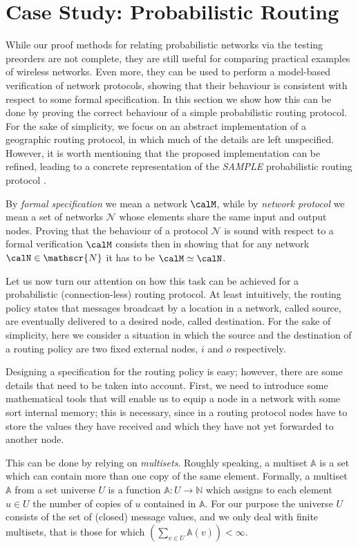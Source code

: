 \documentclass{LMCS}
\begin{document}
\section{Case Study: Probabilistic Routing}
\label{sec:prob.routing}
While our proof methods for relating probabilistic networks 
via the testing preorders are not complete, they are still 
useful for comparing practical examples of wireless networks. 
Even more, they can be used to perform a model-based verification
of network protocols, showing that their behaviour 
is consistent with respect to some formal specification. 
In this section we show how this can be done by proving the 
correct behaviour of a simple probabilistic routing protocol. 
For the sake of simplicity, we focus on an abstract implementation of 
a geographic routing protocol, in which much of the details are left 
unspecified. However, it is worth mentioning that 
the proposed implementation can be refined, leading to a concrete 
representation of the  \emph{SAMPLE} probabilistic routing protocol \cite{sample}.

By \emph{formal specification} we mean a network $\calM$, while by \emph{network protocol} 
we mean a set of networks $\mathscr{N}$ whose elements share the same input and output nodes.
Proving that the behaviour of a protocol $\mathscr{N}$ is sound with respect 
to a formal verification $\calM$ consists then in showing that 
for any network $\calN \in \mathscr{N}$ it has to be 
$\calM \simeq \calN$.

Let us now turn our attention on how this task can be achieved 
for a probabilistic (connection-less) routing protocol. 
At least intuitively, the routing policy states that 
messages broadcast by a location in a network, 
called source, are 
eventually delivered to a desired node, called 
destination. 
For the sake of simplicity, here we consider a 
situation in which the source and the destination 
of a routing policy are two fixed external nodes, 
$i$ and $o$ respectively. 

Designing a specification for the routing policy is 
easy; however, there are some details that need to be 
taken into account. 
First, we need to introduce some mathematical 
tools that will enable us to equip a node in a 
network with some sort internal memory; this is necessary, 
since in a routing protocol nodes have to store 
the values they have received and which they 
have not yet forwarded to another 
node.

This can be done by relying on \emph{multisets}. 
Roughly speaking, a multiset $\mathbb{A}$ 
is a set which can contain more than one copy of 
the same element. Formally, a multiset 
$\mathbb{A}$ from a set universe $U$ is 
a function $\mathbb{A}: U \rightarrow \mathbb{N}$ 
which assigns to each element $u \in U$ the 
number of copies of $u$ contained in $\mathbb{A}$. 
For our purpose the universe $U$ consists of the 
set of (closed) message values, and we only deal with 
finite multisets, that is those for which 
$\left(\sum_{v \in U} \mathbb{A}(v)\right) < \infty$.
\end{document}

